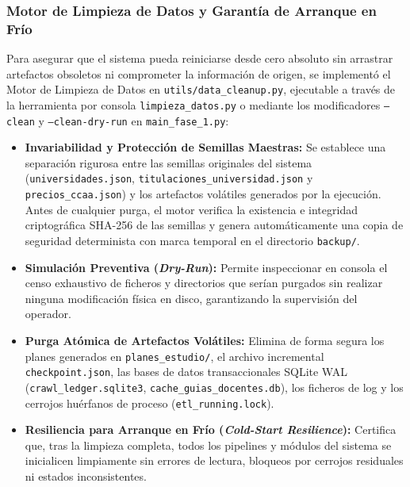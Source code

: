 \subsubsection{Motor de Limpieza de Datos y Garantía de Arranque en Frío}
Para asegurar que el sistema pueda reiniciarse desde cero absoluto sin arrastrar artefactos obsoletos ni comprometer la información de origen, se implementó el Motor de Limpieza de Datos en \texttt{utils/data\_cleanup.py}, ejecutable a través de la herramienta por consola \texttt{limpieza\_datos.py} o mediante los modificadores \texttt{--clean} y \texttt{--clean-dry-run} en \texttt{main\_fase\_1.py}:
\begin{itemize}
    \item \textbf{Invariabilidad y Protección de Semillas Maestras:} Se establece una separación rigurosa entre las semillas originales del sistema (\texttt{universidades.json}, \texttt{titulaciones\_universidad.json} y \texttt{precios\_ccaa.json}) y los artefactos volátiles generados por la ejecución. Antes de cualquier purga, el motor verifica la existencia e integridad criptográfica SHA-256 de las semillas y genera automáticamente una copia de seguridad determinista con marca temporal en el directorio \texttt{backup/}.
    \item \textbf{Simulación Preventiva (\emph{Dry-Run}):} Permite inspeccionar en consola el censo exhaustivo de ficheros y directorios que serían purgados sin realizar ninguna modificación física en disco, garantizando la supervisión del operador.
    \item \textbf{Purga Atómica de Artefactos Volátiles:} Elimina de forma segura los planes generados en \texttt{planes\_estudio/}, el archivo incremental \texttt{checkpoint.json}, las bases de datos transaccionales SQLite WAL (\texttt{crawl\_ledger.sqlite3}, \texttt{cache\_guias\_docentes.db}), los ficheros de log y los cerrojos huérfanos de proceso (\texttt{etl\_running.lock}).
    \item \textbf{Resiliencia para Arranque en Frío (\emph{Cold-Start Resilience}):} Certifica que, tras la limpieza completa, todos los pipelines y módulos del sistema se inicialicen limpiamente sin errores de lectura, bloqueos por cerrojos residuales ni estados inconsistentes.
\end{itemize}

